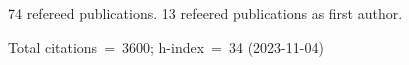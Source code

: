 74 refereed publications. 13 refeered publications as first author.

Total citations~=~3600; h-index~=~34 (2023-11-04)